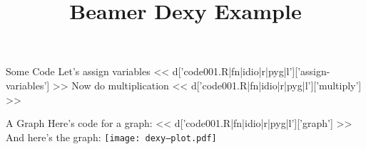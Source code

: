 \documentclass{beamer}
\title{Beamer Dexy Example}
\begin{document}
\begin{frame}
  \titlepage
\end{frame}

\begin{frame}[fragile]{Some Code}
Let's assign variables
<< d['code001.R|fn|idio|r|pyg|l']['assign-variables'] >>
Now do multiplication
<< d['code001.R|fn|idio|r|pyg|l']['multiply'] >>
\end{frame}

\begin{frame}[fragile]{A Graph}
Here's code for a graph:
<< d['code001.R|fn|idio|r|pyg|l']['graph'] >>
And here's the graph:
\texttt{[image: dexy--plot.pdf]}
\end{frame}
\end{document}
